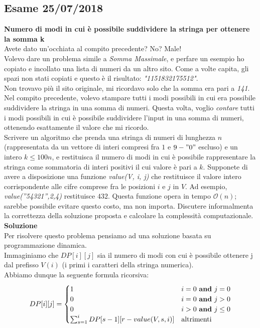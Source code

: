 \documentclass[../cheatSheetAlgoritmi.tex]{subfiles}
\begin{document}
\subsection{Esame 25/07/2018}
\textbf{Numero di modi in cui è possibile suddividere la stringa per ottenere la somma k} \\
Avete dato un’occhiata al compito precedente? No? Male! \\
Volevo dare un problema simile a \emph{Somma Massimale}, e perfare un esempio ho copiato e incollato una lista di numeri da un altro sito. 
Come a volte capita, gli spazi non stati copiati e questo è il risultato: \emph{"1151832175512"}.  \\
Non trovavo più il sito originale, mi ricordavo solo che la somma era pari a \emph{141}. Nel compito precedente, volevo stampare tutti i modi possibili in cui era possibile suddividere la stringa in una somma di numeri. Questa volta, voglio \emph{contare} tutti i modi possibili in cui è possibile suddividere l’input in una somma di numeri, ottenendo esattamente il valore che mi ricordo. \\
Scrivere un algoritmo che prenda una stringa di numeri di lunghezza $n$ (rappresentata da un vettore di interi compresi fra $1$ e $9 - "0"$ escluso) e un intero $k \leq 100n$, e restituisca il numero di modi in cui è possibile rappresentare la stringa come sommatoria di interi positivi il cui valore è pari a $k$. Supponete di avere a disposizione una funzione \emph{value(V, i, j)} che  restituisce  il  valore  intero  corrispondente  alle  cifre comprese  fra  le  posizioni $i$ e $j$ in $V$. Ad  esempio, \emph{value(”54321”,2,4)} restituisce $432$.  
Questa funzione opera in tempo $\mathcal{O}(n)$; sarebbe possibile evitare questo costo, ma non importa. Discutere informalmenta la correttezza della soluzione proposta e calcolare la complessità computazionale. \\
\textbf{Soluzione} \\
Per risolvere questo problema pensiamo ad una soluzione basata su programmazione dinamica. \\ 
Immaginiamo che $DP[i][j]$ sia il numero di modi con cui è possibile ottenere j dal prefisso $V(i)$ (i primi i caratteri della stringa numerica). \\ 
Abbiamo dunque la seguente formula ricorsiva: 
\begin{equation*}
  	DP[i][j] =\begin{cases}
    	1 & \text{$i = 0$ \textbf{and} $j = 0$}\\
    	0 & \text{$i = 0$ \textbf{and} $j > 0$}\\
    	0 & \text{$i > 0$ \textbf{and} $j \leq 0$}\\
    	\sum_{s = 1}^{i} DP[s - 1][r - value(V, s, i)] & \text{altrimenti}
  	\end{cases}
\end{equation*}
\end{document}
